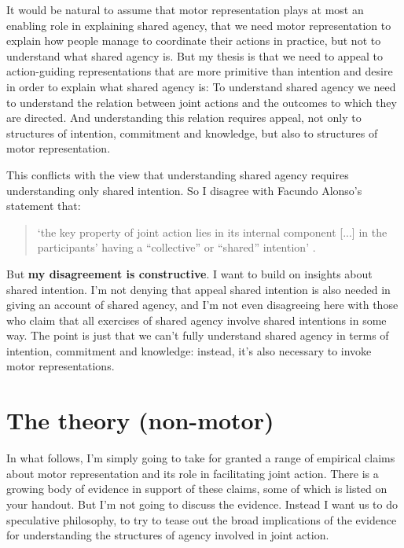 \documentclass[12pt,\papersize]{extarticle}
\begin{document}
It would be natural to assume that
motor representation plays at most an enabling role in explaining shared agency,
that we need motor representation to explain how people manage to coordinate their actions in practice,
but not to understand what shared agency is.
But my thesis is that we need to appeal to action-guiding representations that are more primitive than intention and desire in order to explain what shared agency is:
To understand shared agency we need to understand the relation between joint actions and the  outcomes to which they are directed.
And understanding this relation requires appeal, not only to structures of intention, commitment and knowledge, 
but also to structures of motor representation.


This conflicts with the view that understanding shared agency requires understanding only shared intention.
So I disagree with Facundo Alonso's statement that:
%
\begin{quote}
`the key property of joint action lies in its internal component [...] in the participants' having a ``collective'' or ``shared'' intention' \citep[pp.\ 444-5]{alonso_shared_2009}.
\end{quote}
%
But \textbf{my disagreement is constructive}. 
I want to build on insights about shared intention.
I'm not denying that appeal shared intention is also needed in giving an account of shared agency,  
and I'm not even disagreeing here with those who claim that all exercises of shared agency involve shared intentions in some way.
The point is just that we can't fully understand shared agency in terms of intention, commitment and knowledge:
instead, it's also necessary to invoke motor representations.





\section{The theory (non-motor)}
In what follows, I'm simply going to take for granted a range of empirical claims about motor representation and its role in facilitating joint action.
There is a growing body of evidence in support of these claims, some of which is listed on your handout.
But I'm not going to discuss the evidence.
Instead I want us to do speculative philosophy,
to try to tease out the broad implications of the evidence for understanding the structures of agency involved in joint action.
\end{document}
